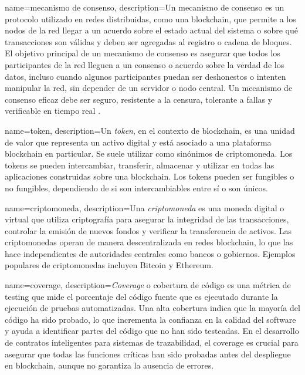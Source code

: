 {
    name=mecanismo de consenso,
    description={Un mecanismo de consenso es un protocolo utilizado en redes distribuidas, como una blockchain, que permite a los nodos de la red llegar a un acuerdo sobre el estado actual del sistema o sobre qué transacciones son válidas y deben ser agregadas al registro o cadena de bloques. El objetivo principal de un mecanismo de consenso es asegurar que todos los participantes de la red lleguen a un consenso o acuerdo sobre la verdad de los datos, incluso cuando algunos participantes puedan ser deshonestos o intenten manipular la red, sin depender de un servidor o nodo central. Un mecanismo de consenso eficaz debe ser seguro, resistente a la censura, tolerante a fallas y verificable en tiempo real \cite{diaz2022protocolos}.}
}

{
    name=token,
    description={Un \textit{token}, en el contexto de blockchain, es una unidad de valor que representa un activo digital y está asociado a una plataforma blockchain en particular. Se suele utilizar como sinónimos de criptomoneda. Los tokens se pueden intercambiar, transferir, almacenar y utilizar en todas las aplicaciones construidas sobre una blockchain. Los tokens pueden ser fungibles o no fungibles, dependiendo de si son intercambiables entre sí o son únicos.}
}

{
    name=criptomoneda,
    description={Una \textit{criptomoneda} es una moneda digital o virtual que utiliza criptografía para asegurar la integridad de las transacciones, controlar la emisión de nuevos fondos y verificar la transferencia de activos. Las criptomonedas operan de manera descentralizada en redes blockchain, lo que las hace independientes de autoridades centrales como bancos o gobiernos. Ejemplos populares de criptomonedas incluyen Bitcoin y Ethereum.}
}

{
    name=coverage,
    description={\textit{Coverage} o  cobertura de código es una métrica de testing que mide el porcentaje del código fuente que es ejecutado durante la ejecución de pruebas automatizadas. Una alta cobertura indica que la mayoría del código ha sido probado, lo que incrementa la confianza en la calidad del software y ayuda a identificar partes del código que no han sido testeadas. En el desarrollo de contratos inteligentes para sistemas de trazabilidad, el coverage es crucial para asegurar que todas las funciones críticas han sido probadas antes del despliegue en blockchain, aunque no garantiza la ausencia de errores.}
}

